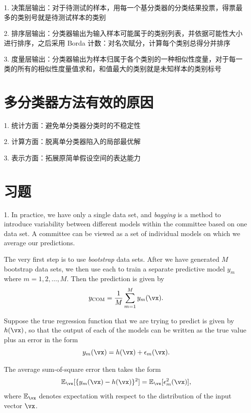 \documentclass[openany]{ctexbook}
\theoremstyle{kaiti}
\theoremstyle{normal}
\begin{document}
1. 决策层输出：对于待测试的样本，用每一个基分类器的分类结果投票，得票最多的类别号就是待测试样本的类别

2. 排序层输出：分类器输出为输入样本可能属于的类别列表，并依据可能性大小进行排序，之后采用 Borda 计数：对名次赋分，计算每个类别总得分并排序

3. 度量层输出：分类器输出为样本归属于各个类别的一种相似性度量，对于每一类的所有的相似性度量值求和，和值最大的类别就是未知样本的类别标号

\section{多分类器方法有效的原因}

1. 统计方面：避免单分类器分类时的不稳定性

2. 计算方面：脱离单分类器陷入的局部最优解

3. 表示方面：拓展原简单假设空间的表达能力

\section{习题}


1. In practice, we have only a single data set, and \emph{bagging} is a method to introduce variability between different models within the committee based on one data set. A committee can be viewed as a set of individual models on which we average our predictions.

The very first step is to use \emph{bootstrap} data sets. After we have generated $M$ bootstrap data sets, we then use each to train a separate predictive model $y_{m}$ where $m = 1,2,\dots, M.$ Then the prediction is given by
\begin{equation}
  y_{\text{COM}}=\frac{1}{M}\sum_{m=1}^{M}y_{m}(\vx).
  \label{eq:y_com}
\end{equation}

Suppose the true regression function that we are trying to predict is given by $h(\vx)$, so that the output of each of the models can be written as the true value plus an error in the form
\begin{equation}
  y_{m}(\vx)=h(\vx)+\epsilon_{m}(\vx).
\end{equation}

The average sum-of-square error then takes the form
\begin{eqnarray}
\mathbb{E}_{\vx}[\{y_{m}(\vx)-h(\vx)\}^{2}]=\mathbb{E}_{\vx}[\epsilon_{m}^{2}(\vx)] ,
\end{eqnarray}
where $\mathbb{E}_{\vx}$ denotes expectation with respect to the distribution of the input vector $\vx$.
\end{document}
